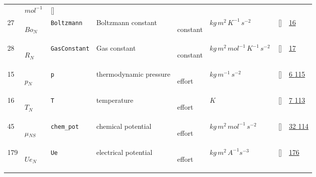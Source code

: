 \begin{longtable}{|p{1cm}|p{3cm}|p{3cm}|p{7cm}|p{3.0cm}|p{3cm}|p{2cm}|p{1cm}|}
             & $ mol^{-1} \, $
             & []
             & \\
    27
             & \hypertarget{"v:27"}{ $ {Bo}{_{N}} $}
             & \verb|Boltzmann|
             & Boltzmann constant
             & \begin{lay}constant \end{lay}
             & $ kg \,m^{2} \,K^{-1} \,s^{-2} \, $
             & []
             & \hyperlink{"e:16"}{ 16 }
                 \\
    28
             & \hypertarget{"v:28"}{ $ {R}{_{N}} $}
             & \verb|GasConstant|
             & Gas constant
             & \begin{lay}constant \end{lay}
             & $ kg \,m^{2} \,mol^{-1} \,K^{-1} \,s^{-2} \, $
             & []
             & \hyperlink{"e:17"}{ 17 }
                 \\
    15
             & \hypertarget{"v:15"}{ $ {p}{_{N}} $}
             & \verb|p|
             & thermodynamic pressure
             & \begin{lay}effort \end{lay}
             & $ kg \,m^{-1} \,s^{-2} \, $
             & []
             & \hyperlink{"e:6"}{ 6 }
                 \hyperlink{"e:115"}{ 115 }
                 \\
    16
             & \hypertarget{"v:16"}{ $ {T}{_{N}} $}
             & \verb|T|
             & temperature
             & \begin{lay}effort \end{lay}
             & $ K \, $
             & []
             & \hyperlink{"e:7"}{ 7 }
                 \hyperlink{"e:113"}{ 113 }
                 \\
    45
             & \hypertarget{"v:45"}{ $ {\mu}{_{{N S}}} $}
             & \verb|chem_pot|
             & chemical potential
             & \begin{lay}effort \end{lay}
             & $ kg \,m^{2} \,mol^{-1} \,s^{-2} \, $
             & []
             & \hyperlink{"e:32"}{ 32 }
                 \hyperlink{"e:114"}{ 114 }
                 \\
    179
             & \hypertarget{"v:179"}{ $ {Ue}{_{N}} $}
             & \verb|Ue|
             & electrical potential
             & \begin{lay}effort \end{lay}
             & $ kg \,m^{2} \,A^{-1} s^{-3} \, $
             & []
             & \hyperlink{"e:176"}{ 176 }

\end{longtable}
